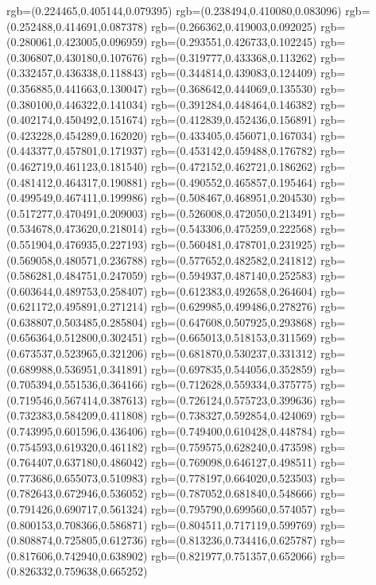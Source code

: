 {{{			rgb=(0.224465,0.405144,0.079395)
			rgb=(0.238494,0.410080,0.083096)
			rgb=(0.252488,0.414691,0.087378)
			rgb=(0.266362,0.419003,0.092025)
			rgb=(0.280061,0.423005,0.096959)
			rgb=(0.293551,0.426733,0.102245)
			rgb=(0.306807,0.430180,0.107676)
			rgb=(0.319777,0.433368,0.113262)
			rgb=(0.332457,0.436338,0.118843)
			rgb=(0.344814,0.439083,0.124409)
			rgb=(0.356885,0.441663,0.130047)
			rgb=(0.368642,0.444069,0.135530)
			rgb=(0.380100,0.446322,0.141034)
			rgb=(0.391284,0.448464,0.146382)
			rgb=(0.402174,0.450492,0.151674)
			rgb=(0.412839,0.452436,0.156891)
			rgb=(0.423228,0.454289,0.162020)
			rgb=(0.433405,0.456071,0.167034)
			rgb=(0.443377,0.457801,0.171937)
			rgb=(0.453142,0.459488,0.176782)
			rgb=(0.462719,0.461123,0.181540)
			rgb=(0.472152,0.462721,0.186262)
			rgb=(0.481412,0.464317,0.190881)
			rgb=(0.490552,0.465857,0.195464)
			rgb=(0.499549,0.467411,0.199986)
			rgb=(0.508467,0.468951,0.204530)
			rgb=(0.517277,0.470491,0.209003)
			rgb=(0.526008,0.472050,0.213491)
			rgb=(0.534678,0.473620,0.218014)
			rgb=(0.543306,0.475259,0.222568)
			rgb=(0.551904,0.476935,0.227193)
			rgb=(0.560481,0.478701,0.231925)
			rgb=(0.569058,0.480571,0.236788)
			rgb=(0.577652,0.482582,0.241812)
			rgb=(0.586281,0.484751,0.247059)
			rgb=(0.594937,0.487140,0.252583)
			rgb=(0.603644,0.489753,0.258407)
			rgb=(0.612383,0.492658,0.264604)
			rgb=(0.621172,0.495891,0.271214)
			rgb=(0.629985,0.499486,0.278276)
			rgb=(0.638807,0.503485,0.285804)
			rgb=(0.647608,0.507925,0.293868)
			rgb=(0.656364,0.512800,0.302451)
			rgb=(0.665013,0.518153,0.311569)
			rgb=(0.673537,0.523965,0.321206)
			rgb=(0.681870,0.530237,0.331312)
			rgb=(0.689988,0.536951,0.341891)
			rgb=(0.697835,0.544056,0.352859)
			rgb=(0.705394,0.551536,0.364166)
			rgb=(0.712628,0.559334,0.375775)
			rgb=(0.719546,0.567414,0.387613)
			rgb=(0.726124,0.575723,0.399636)
			rgb=(0.732383,0.584209,0.411808)
			rgb=(0.738327,0.592854,0.424069)
			rgb=(0.743995,0.601596,0.436406)
			rgb=(0.749400,0.610428,0.448784)
			rgb=(0.754593,0.619320,0.461182)
			rgb=(0.759575,0.628240,0.473598)
			rgb=(0.764407,0.637180,0.486042)
			rgb=(0.769098,0.646127,0.498511)
			rgb=(0.773686,0.655073,0.510983)
			rgb=(0.778197,0.664020,0.523503)
			rgb=(0.782643,0.672946,0.536052)
			rgb=(0.787052,0.681840,0.548666)
			rgb=(0.791426,0.690717,0.561324)
			rgb=(0.795790,0.699560,0.574057)
			rgb=(0.800153,0.708366,0.586871)
			rgb=(0.804511,0.717119,0.599769)
			rgb=(0.808874,0.725805,0.612736)
			rgb=(0.813236,0.734416,0.625787)
			rgb=(0.817606,0.742940,0.638902)
			rgb=(0.821977,0.751357,0.652066)
			rgb=(0.826332,0.759638,0.665252)
}}}
